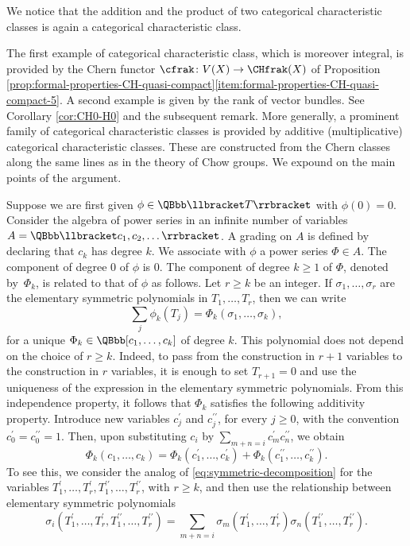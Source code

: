 We notice that the addition and the product of two categorical characteristic classes is again a categorical characteristic class.

The first example of categorical characteristic class, which is moreover integral, is provided by the Chern functor $\cfrak\colon V(X)\to\CHfrak(X)$ of Proposition \ref{prop:formal-properties-CH-quasi-compact}\eqref{item:formal-properties-CH-quasi-compact-5}. A second example is given by the rank of vector bundles. See Corollary \ref{cor:CH0-H0} and the subsequent remark. More generally, a prominent family of categorical characteristic classes is provided by additive (\resp multiplicative) categorical characteristic classes. These are constructed from the Chern classes along the same lines as in the theory of Chow groups. We expound on the main points of the argument.

Suppose we are first given $\phi\in\QBbb\llbracket T\rrbracket$ with $\phi(0)=0$. Consider the algebra of power series in an infinite number of variables $A=\QBbb\llbracket c_{1},c_{2},\ldots\rrbracket$. A grading on $A$ is defined by declaring that $c_{k}$ has degree $k$. We associate with $\phi$ a power series $\Phi\in A$. The component of degree 0 of $\phi$ is 0. The component of degree $k\geq 1$ of $\Phi$, denoted by~$\Phi_{k}$, is related to that of $\phi$ as follows. Let $r\geq k$ be an integer. If $\sigma_{1},\ldots,\sigma_{r}$ are the elementary symmetric polynomials in $T_{1},\ldots, T_{r}$, then we can write
\begin{equation}\label{eq:symmetric-decomposition}
\sum_{j}\phi_{k}(T_{j})=\Phi_{k}(\sigma_{1},\ldots,\sigma_{k}),
\end{equation}
for a unique $\Phi_{k}\in\QBbb[c_{1},\ldots, c_{k}]$ of degree $k$. This polynomial does not depend on the choice of $r\geq k$. Indeed, to pass from the construction in $r+1$ variables to the construction in $r$ variables, it is enough to set $T_{r+1}=0$ and use the uniqueness of the expression in the elementary symmetric polynomials. From this independence property, it follows that $\Phi_{k}$ satisfies the following additivity property. Introduce new variables $c_{j}^{\prime}$ and $c_{j}^{\prime\prime}$, for every $j\geq 0$, with the convention $c_{0}^{\prime}=c_{0}^{\prime\prime}=1$. Then, upon substituting $c_{i}$ by $\sum_{m+n=i}c_{m}^{\prime}c_{n}^{\prime\prime}$, we obtain
\begin{equation}\label{eq:phi-additive-property}
\Phi_{k}(c_{1},\ldots,c_{k})=\Phi_{k}(c_{1}^{\prime},\ldots,c_{k}^{\prime})+\Phi_{k}(c_{1}^{\prime\prime},\ldots,c_{k}^{\prime\prime}).
\end{equation}
To see this, we consider the analog of \eqref{eq:symmetric-decomposition} for the variables $T_{1}^{\prime},\ldots,T_{r}^{\prime},T_{1}^{\prime\prime},\ldots, T_{r}^{\prime\prime}$, with $r\geq k$, and then use the relationship between elementary symmetric polynomials
\begin{displaymath}
\sigma_{i}(T_{1}^{\prime},\ldots,T_{r}^{\prime},T_{1}^{\prime\prime},\ldots, T_{r}^{\prime\prime})
=\sum_{m+n=i}\sigma_{m}(T_{1}^{\prime},\ldots,T_{r}^{\prime})\sigma_{n}(T_{1}^{\prime\prime},\ldots,T_{r}^{\prime\prime}).
\end{displaymath}

